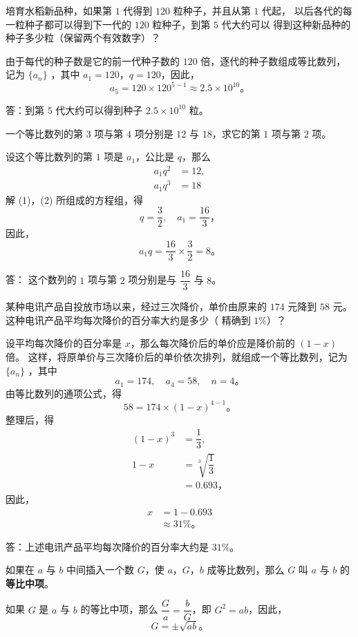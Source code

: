 \liti 培育水稻新品种，如果第 $1$ 代得到 $120$ 粒种子，并且从第 $1$ 代起，
以后各代的每一粒种子都可以得到下一代的 $120$ 粒种子，到第 $5$ 代大约可以
得到这种新品种的种子多少粒（保留两个有效数字）？

\jie 由于每代的种子数是它的前一代种子数的 $120$ 倍，逐代的种子数组成等比数列，
记为 $\{a_n\}$ ，其中 $a_1 = 120$，$q = 120$，因此，
$$ a_5 = 120 \times 120^{5 - 1} \approx 2.5 \times 10^{10} \text{。} $$

答：到第 $5$ 代大约可以得到种子 $2.5 \times 10^{10}$ 粒。


\liti 一个等比数列的第 $3$ 项与第 $4$ 项分别是 $12$ 与 $18$，求它的第 $1$ 项与第 $2$ 项。

\jie 设这个等比数列的第 $1$ 项是 $a_1$，公比是 $q$，那么
\begin{align*}
    a_1 q^2 &= 12, \tag{$1$} \\
    a_1 q^3 &= 18  \tag{$2$}
\end{align*}
解 (1)，(2) 所组成的方程组，得
$$ q = \dfrac{3}{2}, \quad a_1 = \dfrac{16}{3} \text{，} $$
因此，
$$ a_1 q = \dfrac{16}{3} \times \dfrac{3}{2} = 8 \text{。} $$

答： 这个数列的 $1$ 项与第 $2$ 项分别是与 $\dfrac{16}{3}$ 与 $8$。


\liti 某种电讯产品自投放市场以来，经过三次降价，单价由原来的 $174$ 元降到 $58$ 元。
这种电讯产品平均每次降价的百分率大约是多少（ 精确到 $1\%$）？

\jie 设平均每次降价的百分率是 $x$，那么每次降价后的单价应是降价前的 $(1 - x)$ 倍。
这样，将原单价与三次降价后的单价依次排列，就组成一个等比数列，记为 $\{a_n\}$ ，其中
$$ a_1 = 174,\quad a_4 = 58,\quad n = 4 \text{。} $$
由等比数列的通项公式，得
$$ 58 = 174 \times (1 - x)^{4 - 1} \text{。}$$
整理后，得
\begin{align*}
    (1 - x)^3 &= \dfrac{1}{3} , \\
    1 - x &= \sqrt[3]{\dfrac{1}{3}} \\
    &= 0.693 \text{，}
\end{align*}
因此，
\begin{align*}
    x &= 1 - 0.693 \\
      &\approx 31\% \text{。}
\end{align*}

答：上述电讯产品平均每次降价的百分率大约是 $31\%$。

如果在 $a$ 与 $b$ 中间插入一个数 $G$，使 $a$，$G$，$b$ 成等比数列，那么 $G$ 叫 $a$ 与 $b$ 的\textbf{等比中项}。

如果 $G$ 是 $a$ 与 $b$ 的等比中项，那么 $\dfrac{G}{a} = \dfrac{b}{G}$，即 $G^2 = ab$，因此，
$$ G = \pm \sqrt{ab} \text{。}$$

